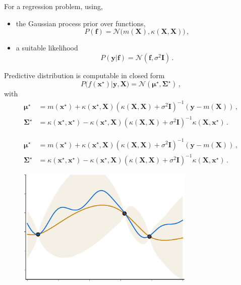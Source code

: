     \begin{frame}
        For a regression problem, using,
        \begin{itemize}
            \item the Gaussian process prior over functions, \[ P(\mathbf f) = \mathcal{N}\Big(m(\mathbf X), \kappa(\mathbf X, \mathbf X)\Big)\,,\]
            \item a suitable likelihood  \[P(\mathbf y| \mathbf f) = \mathcal{N}(\mathbf f, \sigma^2 \mathbf I)\,.\]
        \end{itemize}
        Predictive distribution is computable in closed form
        \[
            P\big(f(\mathbf x^\star)|\mathbf y, \mathbf X\big) = \mathcal{N}( \mathbf \mu^\star, \mathbf \Sigma^\star)\,,
        \]
        with
        \begin{align*}
             \mathbf \mu^\star &= m(\mathbf x^\star) + \kappa(\mathbf x^\star, \mathbf X)(\kappa(\mathbf X, \mathbf X) + \sigma^2\mathbf I)^{-1}(\mathbf y - m(\mathbf X))\,,\\
             \mathbf \Sigma^\star &= \kappa(\mathbf x^\star, \mathbf x^\star) - \kappa(\mathbf x^\star, \mathbf X)(\kappa(\mathbf X, \mathbf X) + \sigma^2\mathbf I)^{-1}\kappa(\mathbf X, \mathbf x^\star)\,.
        \end{align*}
    \end{frame}

    \begin{frame}
            \begin{align*}
             \mathbf \mu^\star &= m(\mathbf x^\star) + \kappa(\mathbf x^\star, \mathbf X)(\kappa(\mathbf X, \mathbf X) + \sigma^2\mathbf I)^{-1}(\mathbf y - m(\mathbf X))\,,\\
             \mathbf \Sigma^\star &= \kappa(\mathbf x^\star, \mathbf x^\star) - \kappa(\mathbf x^\star, \mathbf X)(\kappa(\mathbf X, \mathbf X) + \sigma^2\mathbf I)^{-1}\kappa(\mathbf X, \mathbf x^\star)\,.
        \end{align*}
        \begin{figure}
            \centering
            \includegraphics[width=0.75\textwidth]{imgs/GP_pred.pdf}
        \end{figure}
    \end{frame}

